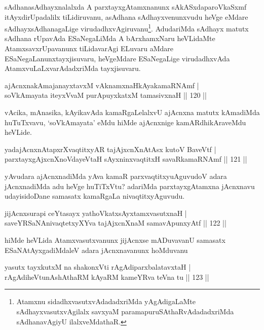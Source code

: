 \begin{artha}
sAdhanasAdhayxnalalxda A parxtayxgAtamxnanunx sAkASxdaparoVkaSxmf itAyxdirUpadalilx tiLidiruvanu, asAdhana sAdhayxvenunxvudu heVge eMdare sAdhayxsAdhanagaLige virudadhxvAgiruvanu\footnote{Atamxnu sidadhxvasutxvAdadadxriMda yAgAdigaLaMte sAdhayxvasutxvAgilalx savxyaM paramapuruSAthaRvAdadadxriMda sAdhanavAgiyU ilalxveMdathaR.}. AdudariMda sAdhayx matutx sAdhana rUpavAda ESaNegaLiMda A bArxhamxNaru heVLidaMte AtamxsavxrUpavanunx tiLidavarAgi ELuvaru aMdare ESaNegaLanunx\break tayxjisuvaru, heVgeMdare ESaNegaLige virudadhxvAda AtamxvuLaLxvarAdadx\-riMda tayxjisuvaru.
\end{artha}

\begin{shl}
ajAcnxnakAmajanayxtavxM vAknamxnaHkAyakamaRNAmf |\\
soV\s kAmayata iteyxVvaM purA\s puyxkatxM tamasivxnaH \hfill || 120 ||
\end{shl}

\begin{artha}%
vAcika, mAnasika, kAyikavAda kamaRgaLelalxvU ajAcnxna matutx kAmadiMda huTuTxvavu, `soV\s kAmayata' eMdu hiMde ajAcnxnige kamARdhikAraveMdu heVLide.
\end{artha}

\begin{shl}
yadajAcnxnAtapxrXvaqtitxyAR tajAjxcnXnAtAsx kutoV BaveVtf |\\
parxtayxgAjxcnXnoVdayeV\s taH sAyxninxvaqtitxH savaRkamaRNAmf \hfill || 121 ||
\end{shl}

\begin{artha}
yAvudara ajAcnxnadiMda yAva kamaR parxvaqtitxyu\break AguvudoV adara jAcnxnadiMda adu heVge huTiTxVtu? adariMda parxtayxgAtamxna jAcnxnavu udayisidoDane samasatx kamaRgaLa nivaqtitxyAguvudu.
\end{artha}

\begin{shl}
jijAcnxsurapi ceYtasayx yathoVkatxsAyx\s \s tamxvasutxnaH |\\
saveYRSaNAnivaqtetxyXYva tajAjxcnXnaM samavApunxyAtf \hfill || 122 ||
\end{shl}

\begin{artha}
hiMde heVLida Atamxvasutxvanunx jijAcnxse mADuvavanU samasatx ESaNAtAyxgadiMdaleV adara jAcnxnavanunx hoMduvanu
\end{artha}

\begin{shl}
yasutx tayxkutxM na shakonxVti rAgAdiparxbalatavxtaH |\\
rAgAdiheVtunAshAthaRM kAyaRM kameYRva teVna tu \hfill || 123 ||
\end{shl}

